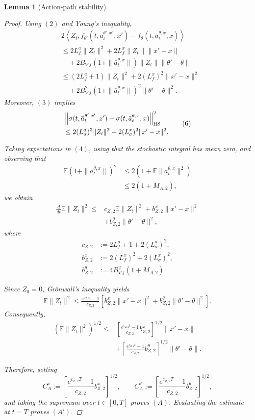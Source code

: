 \documentclass{article}
\newtheorem{lem}[thm]{Lemma}
\theoremstyle{definition}
\theoremstyle{remark}
\theoremstyle{mystyle}
\newcommand{\1}{\mathbbm{1}}
\begin{document}
\begin{lem}[Action-path stability]
\begin{proof}
Using \((2)\) and Young's inequality,
\[
\begin{aligned}
&
2\left\langle
Z_t,
f_{\theta'}(t,\bar a_t^{\theta',x'},x')
-
f_\theta(t,\bar a_t^{\theta,x},x)
\right\rangle\\
&\le
2L_f^a\|Z_t\|^2
+
2L_f^x\|Z_t\|\|x'-x\|\\
&\quad+
2B_{\nabla f}
\left(1+\|\bar a_t^{\theta,x}\|\right)
\|Z_t\|\|\theta'-\theta\|\\
&\le
(2L_f^a+1)\|Z_t\|^2
+
2(L_f^x)^2\|x'-x\|^2\\
&\quad+
2B_{\nabla f}^2
\left(1+\|\bar a_t^{\theta,x}\|\right)^2
\|\theta'-\theta\|^2.
\end{aligned}
\tag{5}
\]
Moreover, \((3)\) implies
\[
\begin{aligned}
&
\left\|
\sigma(t,\bar a_t^{\theta',x'},x')
-
\sigma(t,\bar a_t^{\theta,x},x)
\right\|_{\rm HS}^2\\
&\le
2(L_\sigma^a)^2\|Z_t\|^2
+
2(L_\sigma^x)^2\|x'-x\|^2.
\end{aligned}
\tag{6}
\]

Taking expectations in \((4)\), using that the stochastic integral has
mean zero, and observing that
\[
\begin{aligned}
\mathbb E
\left(1+\|\bar a_t^{\theta,x}\|\right)^2
&\le
2\left(
1+\mathbb E\|\bar a_t^{\theta,x}\|^2
\right)\\
&\le
2(1+M_{A,2}),
\end{aligned}
\]
we obtain
\[
\begin{aligned}
\frac{d}{dt}\mathbb E\|Z_t\|^2
\le{}&
c_{Z,2}\mathbb E\|Z_t\|^2
+
b_{Z,2}^x\|x'-x\|^2\\
&+
b_{Z,2}^\theta\|\theta'-\theta\|^2,
\end{aligned}
\tag{7}
\]
where
\[
\begin{aligned}
c_{Z,2}
&:=
2L_f^a+1+2(L_\sigma^a)^2,\\
b_{Z,2}^x
&:=
2(L_f^x)^2+2(L_\sigma^x)^2,\\
b_{Z,2}^\theta
&:=
4B_{\nabla f}^2(1+M_{A,2}).
\end{aligned}
\tag{8}
\]

Since \(Z_0=0\), Gr\"onwall's inequality yields
\[
\begin{aligned}
\mathbb E\|Z_t\|^2
\le
\frac{e^{c_{Z,2}t}-1}{c_{Z,2}}
\left[
b_{Z,2}^x\|x'-x\|^2
+
b_{Z,2}^\theta\|\theta'-\theta\|^2
\right].
\end{aligned}
\]
Consequently,
\[
\begin{aligned}
\left(\mathbb E\|Z_t\|^2\right)^{1/2}
\le{}&
\left[
\frac{e^{c_{Z,2}t}-1}{c_{Z,2}}
b_{Z,2}^x
\right]^{1/2}
\|x'-x\|\\
&+
\left[
\frac{e^{c_{Z,2}t}-1}{c_{Z,2}}
b_{Z,2}^\theta
\right]^{1/2}
\|\theta'-\theta\|.
\end{aligned}
\]

Therefore, setting
\[
C_A^x
:=
\left[
\frac{e^{c_{Z,2}T}-1}{c_{Z,2}}
b_{Z,2}^x
\right]^{1/2},
\qquad
C_A^\theta
:=
\left[
\frac{e^{c_{Z,2}T}-1}{c_{Z,2}}
b_{Z,2}^\theta
\right]^{1/2},
\]
and taking the supremum over \(t\in[0,T]\) proves \((A)\).
Evaluating the estimate at \(t=T\) proves \((A')\).
\end{proof}
\end{lem}
\end{document}
